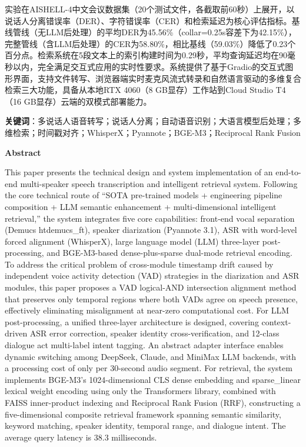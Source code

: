 \documentclass[12pt, a4paper]{article}
\newcommand{\keywordsCN}[1]{\noindent\textbf{关键词}：#1}
\begin{document}
实验在AISHELL-4中文会议数据集（20个测试文件，各截取前60秒）上展开，以说话人分离错误率（DER）、字符错误率（CER）和检索延迟为核心评估指标。基线管线（无LLM后处理）的平均DER为45.56\%（collar=0.25s容差下为42.15\%），完整管线（含LLM后处理）的CER为58.80\%，相比基线（59.03\%）降低了0.23个百分点。检索系统在5段文本上的索引构建时间为0.29秒，平均查询延迟均在90毫秒以内，完全满足交互式应用的实时性要求。系统提供了基于Gradio的交互式图形界面，支持文件转写、浏览器端实时麦克风流式转录和自然语言驱动的多维复合检索三大功能，具备从本地RTX 4060（8 GB显存）工作站到Cloud Studio T4（16 GB显存）云端的双模式部署能力。

\vspace{12pt}
\keywordsCN{多说话人语音转写；说话人分离；自动语音识别；大语言模型后处理；多维检索；时间戳对齐；WhisperX；Pyannote；BGE-M3；Reciprocal Rank Fusion}

\newpage

\begin{center}
\textbf{\large Abstract}
\end{center}

\noindent
This paper presents the technical design and system implementation of an end-to-end multi-speaker speech transcription and intelligent retrieval system. Following the core technical route of ``SOTA pre-trained models + engineering pipeline composition + LLM semantic enhancement + multi-dimensional intelligent retrieval,'' the system integrates five core capabilities: front-end vocal separation (Demucs htdemucs\_ft), speaker diarization (Pyannote 3.1), ASR with word-level forced alignment (WhisperX), large language model (LLM) three-layer post-processing, and BGE-M3-based dense-plus-sparse dual-mode retrieval encoding. To address the critical problem of cross-module timestamp drift caused by independent voice activity detection (VAD) strategies in the diarization and ASR modules, this paper proposes a VAD logical-AND intersection alignment method that preserves only temporal regions where both VADs agree on speech presence, effectively eliminating misalignment at near-zero computational cost. For LLM post-processing, a unified three-layer architecture is designed, covering context-driven ASR error correction, speaker identity cross-verification, and 12-class dialogue act multi-label intent tagging. An abstract adapter interface enables dynamic switching among DeepSeek, Claude, and MiniMax LLM backends, with a processing cost of only  per 30-second audio segment. For retrieval, the system implements BGE-M3's 1024-dimensional CLS dense embedding and sparse\_linear lexical weight encoding using only the Transformers library, combined with FAISS inner-product indexing and Reciprocal Rank Fusion (RRF), constructing a five-dimensional composite retrieval framework spanning semantic similarity, keyword matching, speaker identity, temporal range, and dialogue intent. The average query latency is 38.3 milliseconds.
\end{document}
